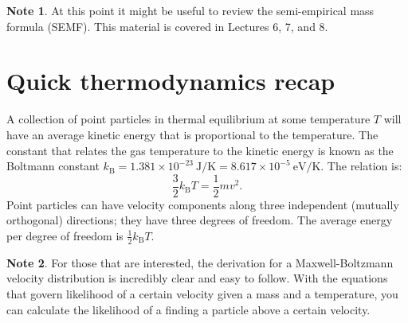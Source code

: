 \documentclass[a4paper,12pt]{article}
\theoremstyle{remark}
\newcommand{\mrm}[1]{\mathrm{#1}}
\renewcommand{\=}[1]{\stackrel{#1}{=}} %
\theoremstyle{plain}
\theoremstyle{definition}
\newtheorem*{definitionT}{Note}%
\newenvironment{note}{
\begin{dBox}
\begin{definitionT}}
{\end{definitionT}
\end{dBox}}
\begin{document}
\begin{note}
At this point it might be useful to review the semi-empirical mass formula (SEMF). This material is covered in Lectures 6, 7, and 8.
\end{note}




\section{Quick thermodynamics recap}
A collection of point particles in thermal equilibrium at some temperature $T$ will have an average kinetic energy that is proportional to the temperature. The constant that relates the gas temperature to the kinetic energy is known as the Boltmann constant $k_\mrm{B} = 1.381 \times 10^{-23} \:\mrm{J/K} = 8.617 \times 10^{-5} \:\mrm{eV/K}$. The relation is:
\begin{equation}
\frac{3}{2} k_\mrm{B} T = \frac{1}{2} mv^{2}.
\end{equation}
Point particles can have velocity components along three independent (mutually orthogonal) directions; they have three degrees of freedom. The average energy per degree of freedom is $\frac{1}{2} k_\mrm{B}T$.

\begin{note}
For those that are interested, the derivation for a Maxwell-Boltzmann velocity distribution is incredibly clear and easy to follow. With the equations that govern likelihood of a certain velocity given a mass and a temperature, you can calculate the likelihood of a finding a particle above a certain velocity.
\end{note}
\end{document}
